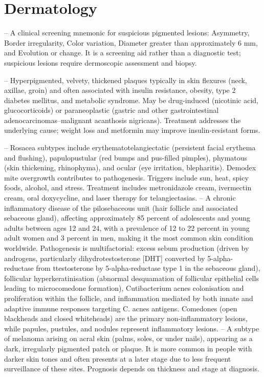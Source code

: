 \chapter{Dermatology}

-- A clinical screening mnemonic for suspicious pigmented lesions: Asymmetry, Border irregularity, Color variation, Diameter greater than approximately 6 mm, and Evolution or change. It is a screening aid rather than a diagnostic test; suspicious lesions require dermoscopic assessment and biopsy.

-- Hyperpigmented, velvety, thickened plaques typically in skin flexures (neck, axillae, groin) and often associated with insulin resistance, obesity, type 2 diabetes mellitus, and metabolic syndrome. May be drug-induced (nicotinic acid, glucocorticoids) or paraneoplastic (gastric and other gastrointestinal adenocarcinomas--malignant acanthosis nigricans). Treatment addresses the underlying cause; weight loss and metformin may improve insulin-resistant forms.

-- Rosacea subtypes include erythematotelangiectatic (persistent facial erythema and flushing), papulopustular (red bumps and pus-filled pimples), phymatous (skin thickening, rhinophyma), and ocular (eye irritation, blepharitis). Demodex mite overgrowth contributes to pathogenesis. Triggers include sun, heat, spicy foods, alcohol, and stress. Treatment includes metronidazole cream, ivermectin cream, oral doxycycline, and laser therapy for telangiectasias.
-- A chronic inflammatory disease of the pilosebaceous unit (hair follicle and associated sebaceous gland), affecting approximately 85 percent of adolescents and young adults between ages 12 and 24, with a prevalence of 12 to 22 percent in young adult women and 3 percent in men, making it the most common skin condition worldwide. Pathogenesis is multifactorial: excess sebum production (driven by androgens, particularly dihydrotestosterone [DHT] converted by 5-alpha-reductase from ttestosterone by 5-alpha-reductase type 1 in the sebaceous gland), follicular hyperkeratinisation (abnormal desquamation of follicular epithelial cells leading to microcomedone formation), Cutibacterium acnes colonisation and proliferation within the follicle, and inflammation mediated by both innate and adaptive immune responses targeting C. acnes antigens. Comedones (open blackheads and closed whiteheads) are the primary non-inflammatory lesions, while papules, pustules, and nodules represent inflammatory lesions.
-- A subtype of melanoma arising on acral skin (palms, soles, or under nails), appearing as a dark, irregularly pigmented patch or plaque. It is more common in people with darker skin tones and often presents at a later stage due to less frequent surveillance of these sites. Prognosis depends on thickness and stage at diagnosis.

